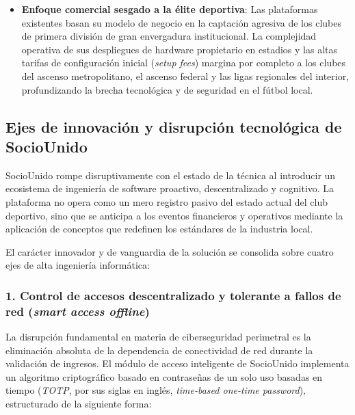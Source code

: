 \documentclass[conference, a4paper]{IEEEtran}
\begin{document}
\begin{itemize}
    \item \textbf{Enfoque comercial sesgado a la \'elite deportiva}: Las plataformas existentes basan su modelo de negocio en la captaci\'on agresiva de los clubes de primera divisi\'on de gran envergadura institucional. La complejidad operativa de sus despliegues de hardware propietario en estadios y las altas tarifas de configuraci\'on inicial (\textit{setup fees}) margina por completo a los clubes del ascenso metropolitano, el ascenso federal y las ligas regionales del interior, profundizando la brecha tecnol\'ogica y de seguridad en el f\'utbol local.
\end{itemize}

\subsection{Ejes de innovaci\'on y disrupci\'on tecnol\'ogica de SocioUnido}
SocioUnido rompe disruptivamente con el estado de la t\'ecnica al introducir un ecosistema de ingenier\'ia de software proactivo, descentralizado y cognitivo. La plataforma no opera como un mero registro pasivo del estado actual del club deportivo, sino que se anticipa a los eventos financieros y operativos mediante la aplicaci\'on de conceptos que redefinen los est\'andares de la industria local. 

El car\'acter innovador y de vanguardia de la soluci\'on se consolida sobre cuatro ejes de alta ingenier\'ia inform\'atica:

\subsubsection{1. Control de accesos descentralizado y tolerante a fallos de red (\textit{smart access offline})}
La disrupci\'on fundamental en materia de ciberseguridad perimetral es la eliminaci\'on absoluta de la dependencia de conectividad de red durante la validaci\'on de ingresos. El m\'odulo de acceso inteligente de SocioUnido implementa un algoritmo criptogr\'afico basado en contrase\~nas de un solo uso basadas en tiempo (\textit{TOTP}, por sus siglas en ingl\'es, \textit{time-based one-time password}), estructurado de la siguiente forma:
\end{document}
